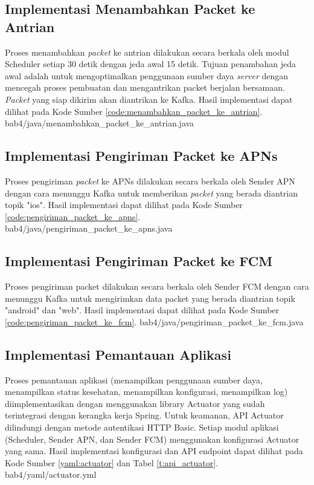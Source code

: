 \subsection{Implementasi Menambahkan Packet ke Antrian}
\par Proses menambahkan \textit{packet} ke antrian dilakukan secara berkala oleh modul Scheduler setiap 30 detik dengan jeda awal 15 detik. Tujuan penambahan jeda awal adalah untuk mengoptimalkan penggunaan sumber daya \textit{server} dengan mencegah proses pembuatan dan mengantrikan packet berjalan bersamaan. \textit{Packet} yang siap dikirim akan diantrikan ke Kafka. Hasil implementasi dapat dilihat pada Kode Sumber \ref{code:menambahkan_packet_ke_antrian}.
 {bab4/java/menambahkan_packet_ke_antrian.java}

\subsection{Implementasi Pengiriman Packet ke APNs}
\par Proses pengiriman \textit{packet} ke APNs dilakukan secara berkala oleh Sender APN dengan cara menunggu Kafka untuk memberikan \textit{packet} yang berada diantrian topik "ios". Hasil implementasi dapat dilihat pada Kode Sumber \ref{code:pengiriman_packet_ke_apns}.
 {bab4/java/pengiriman_packet_ke_apns.java}

\subsection{Implementasi Pengiriman Packet ke FCM}
\par Proses pengiriman packet dilakukan secara berkala oleh Sender FCM dengan cara menunggu Kafka untuk mengirimkan data packet yang berada diantrian topik "android" dan "web". Hasil implementasi dapat dilihat pada Kode Sumber \ref{code:pengiriman_packet_ke_fcm}.
 {bab4/java/pengiriman_packet_ke_fcm.java}

\subsection{Implementasi Pemantauan Aplikasi}
\par Proses pemantauan aplikasi (menampilkan penggunaan sumber daya, menampilkan status kesehatan, menampilkan konfigurasi, menampilkan log) diimplementasikan dengan menggunakan library Actuator yang sudah terintegrasi dengan kerangka kerja Spring. Untuk keamanan, API Actuator dilindungi dengan metode autentikasi HTTP Basic. Setiap modul aplikasi (Scheduler, Sender APN, dan Sender FCM) menggunakan konfigurasi Actuator yang sama. Hasil implementasi konfigurasi dan API endpoint dapat dilihat pada Kode Sumber \ref{yaml:actuator} dan Tabel \ref{t:api_actuator}.
 {bab4/yaml/actuator.yml}

